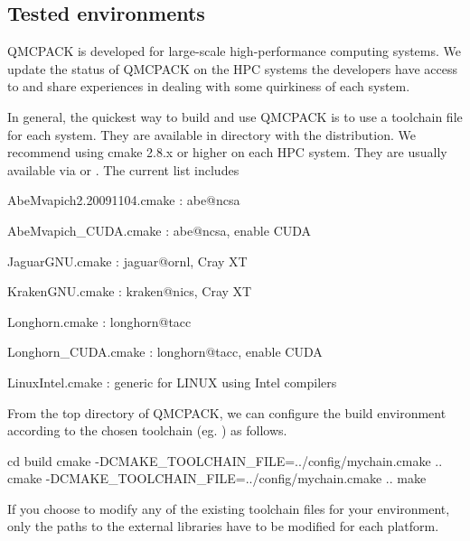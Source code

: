 \subsection{Tested environments}
QMCPACK is developed for large-scale high-performance computing systems. We update the status of QMCPACK on the HPC systems the developers have access to and share experiences in dealing with some quirkiness of each system.

In general, the quickest way to build and use QMCPACK is to use a toolchain
file for each system. They are available in  directory with the
distribution. We recommend using cmake 2.8.x or higher on each HPC system. They are usually
available via  or . 
The current list includes
\begin{itemize*}
\item{} AbeMvapich2.20091104.cmake : abe@ncsa
\item{} AbeMvapich\_CUDA.cmake : abe@ncsa, enable CUDA
\item{} JaguarGNU.cmake : jaguar@ornl, Cray XT
\item{} KrakenGNU.cmake : kraken@nics, Cray XT
\item{} Longhorn.cmake : longhorn@tacc
\item{} Longhorn\_CUDA.cmake : longhorn@tacc, enable CUDA
\item{} LinuxIntel.cmake : generic for LINUX using Intel compilers
\end{itemize*}
From the top directory of QMCPACK, we can configure the build environment
according to the chosen toolchain (eg. ) as follows.
\begin{term}
cd build
cmake -DCMAKE_TOOLCHAIN_FILE=../config/mychain.cmake ..
cmake -DCMAKE_TOOLCHAIN_FILE=../config/mychain.cmake ..
make
\end{term}
If you choose to modify any of the existing toolchain files for your
environment, only the paths to the external libraries have to be modified for
each platform. 

